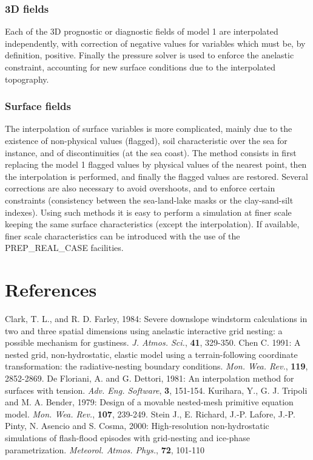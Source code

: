 \subsubsection{3D fields}

Each of the 3D prognostic or diagnostic fields of model 1 are interpolated
independently, with correction of negative values for variables which must be,
by definition, positive. Finally the pressure solver is used to enforce the
anelastic constraint, accounting for new surface conditions due
to the interpolated topography.

\subsubsection{Surface fields}

 The interpolation of surface variables is more complicated, mainly due
to the existence of non-physical values (flagged), soil characteristic over the
sea for instance, and of discontinuities (at the sea coast).
The method consists in first replacing the model 1 flagged values by
physical values of the nearest point, then the interpolation is
performed, and finally the flagged values are restored. Several corrections
are also necessary to avoid overshoots, and to enforce certain constraints
(consistency between the sea-land-lake masks or the clay-sand-silt indexes).
Using such methods it is easy to perform a simulation at finer scale keeping
the same surface characteristics (except the interpolation). If
available, finer scale characteristics can be introduced with the use of
the PREP\_REAL\_CASE facilities.

\section{References}
\decrefname
Clark, T. L., and R. D. Farley, 1984:
Severe downslope windstorm calculations in two and three
spatial dimensions using anelastic interactive grid nesting: a possible
mechanism for gustiness. {\it J. Atmos. Sci.},  {\bf 41}, 329-350.
\decrefname
Chen C. 1991:
A nested grid, non-hydrostatic, elastic model using a terrain-following
coordinate transformation: the radiative-nesting boundary conditions.
{\it Mon. Wea. Rev.},  {\bf 119}, 2852-2869.
\decrefname
De Floriani, A. and G. Dettori, 1981:
An interpolation method for surfaces with tension.
{\it Adv. Eng. Software},  {\bf  3}, 151-154.
\decrefname
Kurihara, Y., G. J. Tripoli and M. A. Bender, 1979:
Design of a movable nested-mesh primitive equation model.
{\it Mon. Wea. Rev.},  {\bf 107}, 239-249.
\decrefname
Stein J., E. Richard, J.-P. Lafore, J.-P. Pinty, N. Asencio
and S. Cosma, 2000:
High-resolution non-hydrostatic simulations of flash-flood
episodes with grid-nesting and ice-phase parametrization.
{\it Meteorol. Atmos. Phys.},  {\bf 72}, 101-110
%

